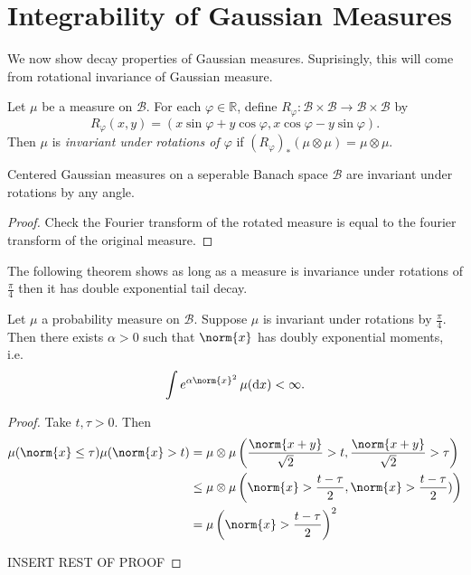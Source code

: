 \documentclass[fontsize=12pt, DIV=10]{scrreprt}
\theoremstyle{remark}
\newcommand{\R}{\mathbb R}
\newcommand{\calB}{\mathcal B}
\newcommand{\dif}[1]{\text{d} #1}
\renewcommand{\phi}{\varphi}
\begin{document}
\section{Integrability of Gaussian Measures}

We now show decay properties of Gaussian measures. Suprisingly, this will come from rotational invariance of Gaussian measure. 

\begin{defn}
	Let $\mu$ be a measure on $\calB$. For each $\phi \in \R$, define $R_{\phi}: \calB \times \calB \to \calB \times \calB$ by
	\begin{equation}
		R_{\phi}(x, y) = (x \sin \phi + y \cos \phi, x \cos \phi - y \sin \phi).
	\end{equation}
	Then $\mu$ is \emph{invariant under rotations of $\phi$} if $(R_{\phi})_* (\mu \otimes \mu) = \mu \otimes \mu$.
\end{defn}

\begin{prop}
	Centered Gaussian measures on a seperable Banach space $\calB$ are invariant under rotations by any angle.
\end{prop}
\begin{proof}
	Check the Fourier transform of the rotated measure is equal to the fourier transform of the original measure.
\end{proof}

The following theorem shows as long as a measure is invariance under rotations of $\frac{\pi}{4}$ then it has double exponential tail decay.
\begin{theorem}[Fernique]
	Let $\mu$ a probability measure on $\calB$. Suppose $\mu$ is invariant under rotations by $\frac{\pi}{4}$. Then there exists $\alpha > 0$ such that $\norm{x}$ has doubly exponential moments, i.e.\
	\begin{equation}
		\int e^{\alpha \norm{x}^2} \, \mu(\dif x) < \infty.
	\end{equation}
\end{theorem}
\begin{proof}
	Take $t, \tau > 0$. Then
	\begin{align}
		\mu(\norm{x} \leq \tau) \mu(\norm{x} > t)
		&= \mu \otimes \mu\left( \frac{\norm{x + y}}{\sqrt{2}} > t, \frac{\norm{x+y}}{\sqrt{2}} > \tau \right) \\
		&\leq \mu \otimes \mu \left(\norm{x} > \frac{t - \tau}{2}, \norm{x} > \frac{t - \tau}{2}) \right) \\
		&= \mu\left(\norm{x} > \frac{t - \tau}{2}\right)^2
	\end{align}

	INSERT REST OF PROOF
\end{proof}
\end{document}
